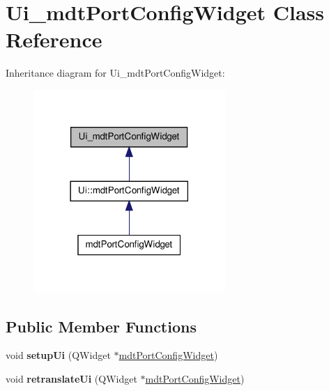 \hypertarget{class_ui__mdt_port_config_widget}{
\section{Ui\_\-mdtPortConfigWidget Class Reference}
\label{class_ui__mdt_port_config_widget}
}


Inheritance diagram for Ui\_\-mdtPortConfigWidget:\nopagebreak
\begin{figure}[H]
\begin{center}
\leavevmode
\includegraphics[width=206pt]{class_ui__mdt_port_config_widget__inherit__graph}
\end{center}
\end{figure}
\subsection*{Public Member Functions}
\begin{DoxyCompactItemize}
\item 
\hypertarget{class_ui__mdt_port_config_widget_a6d31592db1dc60b49f4576d6aba13b52}{
void {\bfseries setupUi} (QWidget $\ast$\hyperlink{classmdt_port_config_widget}{mdtPortConfigWidget})}
\label{class_ui__mdt_port_config_widget_a6d31592db1dc60b49f4576d6aba13b52}

\item 
\hypertarget{class_ui__mdt_port_config_widget_ab022687e43d0070dea283dc1f9386869}{
void {\bfseries retranslateUi} (QWidget $\ast$\hyperlink{classmdt_port_config_widget}{mdtPortConfigWidget})}
\label{class_ui__mdt_port_config_widget_ab022687e43d0070dea283dc1f9386869}

\end{DoxyCompactItemize}
